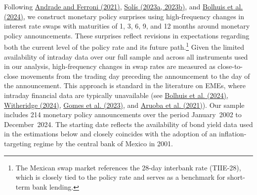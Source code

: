 \documentclass[\latexroot/\projectname]{subfiles}
\begin{document}
Following \hyperlink{Andrade and Ferroni (2021)}{Andrade and Ferroni (2021)}, \hyperlink{Solis (2023a)}{Solís (2023a, 2023b)}, and \hyperlink{Bolhuis et al. (2024)}{Bolhuis et al. (2024)}, we construct monetary policy surprises using high-frequency changes in interest rate swaps with maturities of 1, 3, 6, 9, and 12 months around monetary policy announcements. These surprises reflect revisions in expectations regarding both the current level of the policy rate and its future path.\footnote{The Mexican swap market references the 28-day interbank rate (TIIE-28), which is closely tied to the policy rate and serves as a benchmark for short-term bank lending.} Given the limited availability of intraday data over our full sample and across all instruments used in our analysis, high-frequency changes in swap rates are measured as close-to-close movements from the trading day preceding the announcement to the day of the announcement. This approach is standard in the literature on EMEs, where intraday financial data are typically unavailable (see \hyperlink{Bolhuis et al. (2024)}{Bolhuis et al. (2024)}, \hyperlink{Witheridge (2024)}{Witheridge (2024)}, \hyperlink{Gomes et al. (2023)}{Gomes et al. (2023)}, and \hyperlink{Aruoba et al. (2021)}{Aruoba et al. (2021)}). Our sample includes 214 monetary policy announcements over the period January~2002 to December~2024. The starting date reflects the availability of bond yield data used in the estimations below and closely coincides with the adoption of an inflation-targeting regime by the central bank of Mexico in 2001.
\end{document}
